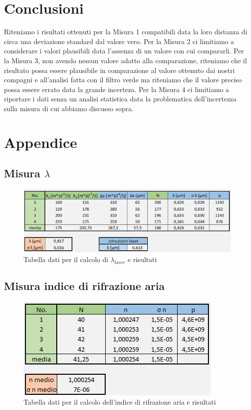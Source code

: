 \documentclass{article}
\begin{document}
\section{Conclusioni}
Riteniamo i risultati ottenuti per la Misura 1 compatibili data la loro distanza di circa una deviazione standard dal valore vero. Per la Misura 2 ci limitiamo a considerare i valori plausibili data l'assenza di un valore con cui compararli. Per la Misura 3, non avendo nessun valore adatto alla comparazione, riteniamo che il risultato possa essere plausibile in comparazione al valore ottenuto dai nostri compagni e all'analisi fatta con il filtro verde ma riteniamo che il valore preciso possa essere errato data la grande incerteza. Per la Misura 4 ci limitiamo a riportare i dati senza un analisi statistica data la problematica dell'incertezza sulla misura di cui abbiamo discusso sopra.




\section{Appendice}
\subsection{Misura $\lambda$}

\begin{figure}[h!]
  \centering
  \includegraphics[width=1\linewidth]{IM tabella lambda}
  \caption{Tabella dati per il calcolo di $\lambda_{laser}$ e risultati}
\end{figure}

\clearpage 

\subsection{Misura indice di rifrazione aria}


\begin{figure}[h!]
  \centering
  \includegraphics[width=0.6\linewidth]{IM tabella n}
  \caption{Tabella dati per il calcolo dell'indice di rifrazione aria e risultati}
\end{figure}
\end{document}
